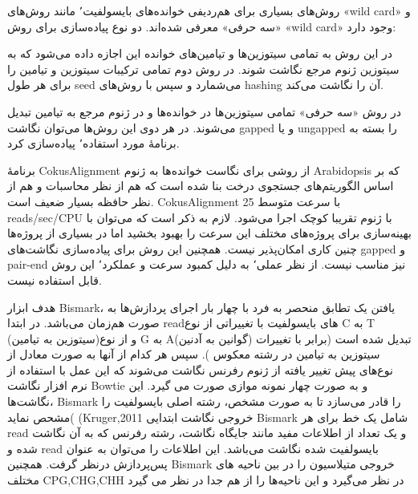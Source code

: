 

روش‌های بسیاری برای هم‌ردیفی خوانده‌های بایسولفیت٬ مانند روش‌های «wild card» و «سه حرفی» معرفی شده‌اند. دو نوع پیاده‌سازی برای روش «wild card» وجود دارد:

 در این روش به تمامی سیتوزین‌ها و تیامین‌های خوانده این اجازه داده می‌شود که به سیتوزین ژنوم مرجع نگاشت شوند.
 در روش دوم تمامی ترکیبات سیتوزین و تیامین را برای هر طول seed می‌شمارد و سپس با روش‌های hashing آن را نگاشت می‌کند.

در روش «سه حرفی» تمامی سیتوزین‌ها در خوانده‌ها و در ژنوم مرجع به تیامین تبدیل می‌شوند. در هر دوی این روش‌ها می‌توان نگاشت gapped و یا ungapped را بسته به برنامهٔ مورد استفاده٬ پیاده‌سازی کرد.


برنامهٔ  CokusAlignment  از روشی برای نگاست خوانده‌ها به ژنوم Arabidopsis که بر اساس الگوریتم‌های جستجوی درخت بنا شده است که هم از نظر محاسبات و هم از نظر حافظه بسیار ضعیف است. CokusAlignment با سرعت متوسط 25 reads/sec/CPU با ژنوم تقریبا کوچک اجرا می‌شود. لازم به ذکر است که می‌توان با بهینه‌سازی برای پروژه‌های مختلف این سرعت را بهبود بخشید اما در بسیاری از پروژه‌ها چنین کاری امکان‌پذیر نیست. همچنین این روش برای پیاده‌سازی نگاشت‌های gapped و pair-end نیز مناسب نیست. از نظر عملی٬ به دلیل کمبود سرعت و عملکرد٬ این روش قابل استفاده نیست.


هدف ابزار Bismark، یافتن یک تطابق منحصر به فرد با چهار بار اجرای پردازش‌ها به صورت هم‌زمان می‌باشد. در ابتدا readهای بایسولفیت با تغییراتی از نوع C  به T (سیتوزین به تیامین)و از نوع G به  A(گوانین به آدنین) تبدیل شده است (برابر با تغییرات  سیتوزین به تیامین در رشته معکوس ). سپس هر کدام از آنها به صورت معادل از نوع‌های پیش تغییر یافته از ژنوم رفرنس نگاشت می‌شوند که این عمل با استفاده از نرم افزار نگاشت Bowtie و به صورت چهار نمونه موازی صورت می گیرد. این نگاشت‌ها، Bismark را قادر می‌سازد تا به صورت مشخص، رشته اصلی بایسولفیت را مشحص نماید( (Kruger,2011
خروجی نگاشت ابتدایی Bismark شامل یک خط برای هر read و یک تعداد از اطلاعات مفید مانند جایگاه نگاشت، رشته رفرنس که به آن نگاشت شده و read بایسولفیت شده نگاشت می‌باشد. این اطلاعات را می‌توان به عنوان پس‌پردازش درنظر گرفت. همچنین Bismark خروجی متیلاسیون را در بین ناحیه های مختلف CPG,CHG,CHH  در نظر می‌گیرد و این ناحیه‌ها را از هم جدا در نظر می گیرد


